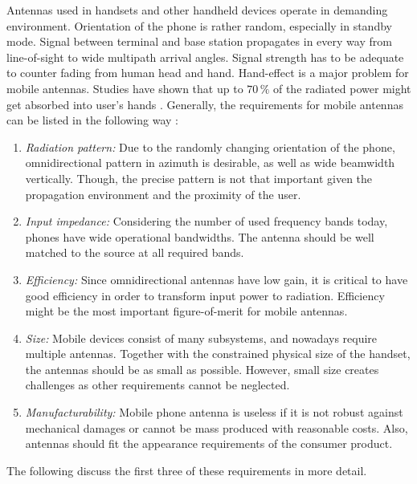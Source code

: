 Antennas used in handsets and other handheld devices operate in demanding environment. Orientation of the phone is rather random, especially in standby mode. Signal between terminal and base station propagates in every way from line-of-sight to wide multipath arrival angles. Signal strength has to be adequate to counter fading from human head and hand. Hand-effect is a major problem for mobile antennas. Studies have shown that up to $70\,\%$ of the radiated power might get absorbed into user's hands \cite{valkonen_phd}. Generally, the requirements for mobile antennas can be listed in the following way \cite{saunders, lehtovuori_phd}:
\begin{enumerate}
    \item \textit{Radiation pattern:} Due to the randomly changing orientation of the phone, omnidirectional pattern in azimuth is desirable, as well as wide beamwidth vertically. Though, the precise pattern is not that important given the propagation environment and the proximity of the user.
    \item \textit{Input impedance:} Considering the number of used frequency bands today, phones have wide operational bandwidths. The antenna should be well matched to the source at all required bands.
    \item \textit{Efficiency:} Since omnidirectional antennas have low gain, it is critical to have good efficiency in order to transform input power to radiation. Efficiency might be the most important figure-of-merit for mobile antennas.
    \item \textit{Size:} Mobile devices consist of many subsystems, and nowadays require multiple antennas. Together with the constrained physical size of the handset, the antennas should be as small as possible. However, small size creates challenges as other requirements cannot be neglected.
    \item \textit{Manufacturability:} Mobile phone antenna is useless if it is not robust against mechanical damages or cannot be mass produced with reasonable costs. Also, antennas should fit the appearance requirements of the consumer product. 
\end{enumerate}

The following  discuss the first three of these requirements in more detail.


